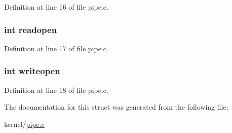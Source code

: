 Definition at line 16 of file pipe.\-c.

\hypertarget{structpipe_a2c616f92018c3e3ed5337568ec96173f}{
\subsubsection[{readopen}]{\setlength{\rightskip}{0pt plus 5cm}int readopen}}\label{structpipe_a2c616f92018c3e3ed5337568ec96173f}


Definition at line 17 of file pipe.\-c.

\hypertarget{structpipe_ae4254bf1d401e056beef1e2630c334e5}{
\subsubsection[{writeopen}]{\setlength{\rightskip}{0pt plus 5cm}int writeopen}}\label{structpipe_ae4254bf1d401e056beef1e2630c334e5}


Definition at line 18 of file pipe.\-c.



The documentation for this struct was generated from the following file\-:\begin{DoxyCompactItemize}
\item 
kernel/\hyperlink{pipe_8c}{pipe.\-c}\end{DoxyCompactItemize}
